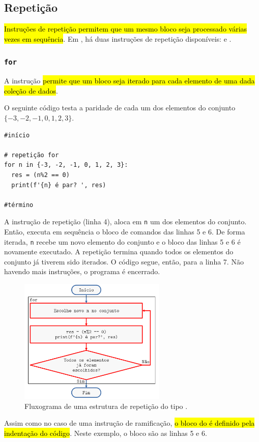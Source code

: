 \subsection{Repetição}

\hl{Instruções de repetição permitem que um mesmo bloco seja processado várias vezes em sequência}. Em {\python}, há duas instruções de repetição disponíveis: {\PYTHONfor} e {\PYTHONwhile}. 

\subsubsection{\texttt{for}}

A instrução \hl{{\PYTHONfor} permite que um bloco seja iterado para cada elemento de uma dada coleção de dados}.

\begin{ex}\label{cap_progest_sec_est:ex:for}
  O seguinte código testa a paridade de cada um dos elementos do conjunto $\{-3, -2, -1, 0, 1, 2, 3\}$.

\begin{lstlisting}
#início

# repetição for
for n in {-3, -2, -1, 0, 1, 2, 3}:
  res = (n%2 == 0)
  print(f'{n} é par? ', res)
    
#término
\end{lstlisting}

A instrução de repetição {\PYTHONfor} (linha 4), aloca em \lstinline+n+ um dos elementos do conjunto. Então, executa em sequência o bloco de comandos das linhas 5 e 6. De forma iterada, \lstinline+n+ recebe um novo elemento do conjunto e o bloco das linhas 5 e 6 é novamente executado. A repetição termina quando todos os elementos do conjunto já tiverem sido iterados. O código segue, então, para a linha 7. Não havendo mais instruções, o programa é encerrado.

\begin{figure}[H]
  \centering
  \includegraphics[width=2.75in]{./cap_progest/dados/fig_fg_for/fig.png}
  \caption{Fluxograma de uma estrutura de repetição do tipo {\PYTHONfor}.}
  \label{cap_progest_sec_est:fig:fg_for}
\end{figure}

Assim como no caso de uma instrução de ramificação, \hl{o bloco do {\PYTHONfor} é definido pela indentação do código}. Neste exemplo, o bloco são as linhas 5 e 6.
\end{ex}

